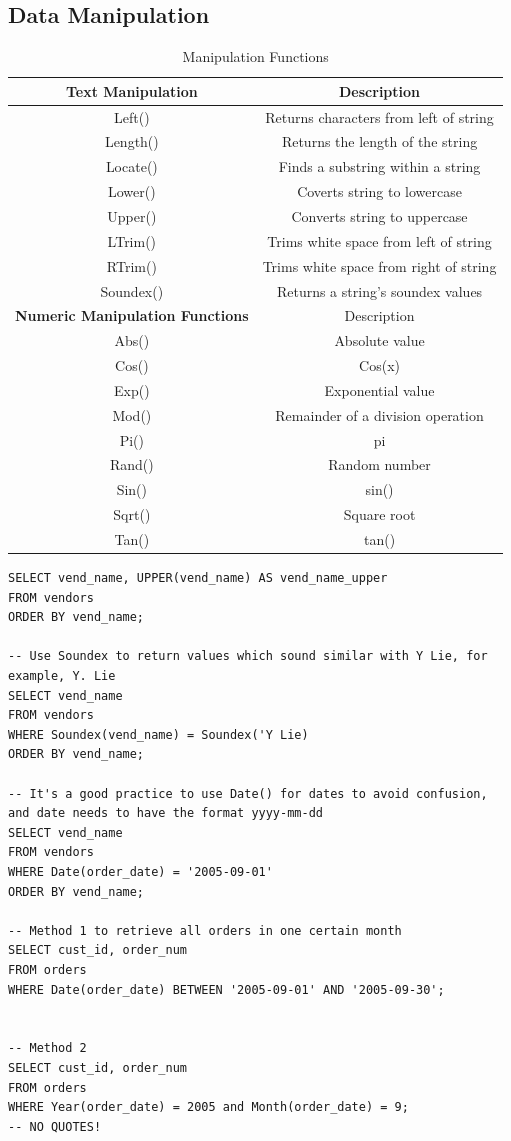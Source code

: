 \documentclass[12pt,oneside,a4paper]{article}
\begin{document}
\subsection{Data Manipulation}
\begin{table}[h]
	\centering
	\begin{tabular}{ |c|c|} 
		\hline
		\textbf{Text Manipulation} & Description\\ 
		\hline
		Left() & Returns characters from left of string \\ 
		Length()& Returns the length of the string\\ 
		Locate() & Finds a substring within a string\\ 
		Lower() & Coverts string to lowercase \\ 
		Upper() & Converts string to uppercase\\
		LTrim() & Trims white space from left of string\\
		RTrim() & Trims white space from right of string\\
		Soundex() & Returns a string's soundex values\\
		\hline
		\textbf{Numeric Manipulation Functions} & Description\\
		\hline
		Abs() & Absolute value \\
		Cos() & Cos(x)\\
		Exp() & Exponential value \\
		Mod() & Remainder of a division operation \\
		Pi() & pi\\
		Rand() & Random number \\
		Sin() & sin()\\
		Sqrt() & Square root \\
		Tan() & tan()\\
		\hline
	\end{tabular}
	\caption{Manipulation Functions}
\end{table}
\FloatBarrier

\begin{lstlisting}
SELECT vend_name, UPPER(vend_name) AS vend_name_upper
FROM vendors 
ORDER BY vend_name;

-- Use Soundex to return values which sound similar with Y Lie, for example, Y. Lie
SELECT vend_name
FROM vendors 
WHERE Soundex(vend_name) = Soundex('Y Lie)
ORDER BY vend_name;

-- It's a good practice to use Date() for dates to avoid confusion, and date needs to have the format yyyy-mm-dd
SELECT vend_name
FROM vendors 
WHERE Date(order_date) = '2005-09-01'
ORDER BY vend_name;

-- Method 1 to retrieve all orders in one certain month 
SELECT cust_id, order_num
FROM orders 
WHERE Date(order_date) BETWEEN '2005-09-01' AND '2005-09-30';


-- Method 2
SELECT cust_id, order_num
FROM orders 
WHERE Year(order_date) = 2005 and Month(order_date) = 9;
-- NO QUOTES!
\end{lstlisting}
\end{document}
